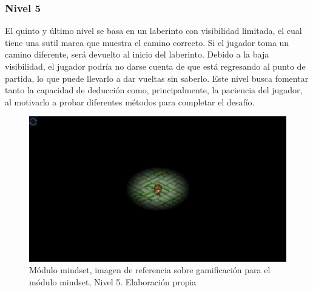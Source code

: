 \subsubsection{Nivel 5}
El quinto y último nivel se basa en un laberinto con visibilidad limitada, el cual tiene una sutil marca que muestra el camino correcto. Si el jugador toma un camino diferente, será devuelto al inicio del laberinto. Debido a la baja visibilidad, el jugador podría no darse cuenta de que está regresando al punto de partida, lo que puede llevarlo a dar vueltas sin saberlo. Este nivel busca fomentar tanto la capacidad de deducción como, principalmente, la paciencia del jugador, al motivarlo a probar diferentes métodos para completar el desafío.

\begin{figure}[H]
  \centering
  \includegraphics[width=0.7\linewidth]{Imagenes/Nivel5.png}
  \caption{Módulo mindset, imagen de referencia sobre gamificación para el módulo mindset, Nivel 5. Elaboración propia}
  \label{fig:imagen1mindset}
\end{figure}
